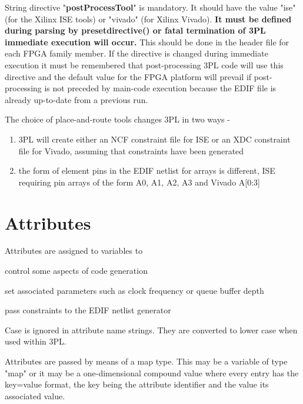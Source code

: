         String directive "{\bf postProcessTool}" is mandatory. It should have
	the value "ise" (for the Xilinx ISE tools) or "vivado" (for Xilinx
	Vivado).  {\bf It must be defined
        during parsing by presetdirective() or fatal termination of 3PL
        immediate execution will occur.} This should be done in the header file
        for each FPGA family member. If the directive is changed during
        immediate execution it must be remembered that post-processing 3PL code
        will use this directive and the default value for the FPGA platform
        will prevail if post-processing is not preceded by main-code execution
        because the EDIF file is already up-to-date from a previous run.
        
        The choice of place-and-route tools changes 3PL in two ways -
        \begin{enumerate}
        \item   3PL will create either an NCF constraint file for ISE or an
                XDC constraint file for Vivado, assuming that constraints
                have been generated
        \item   the form of element pins in the EDIF netlist for arrays is
                different, ISE requiring pin arrays of the form A0, A1, A2,
                A3 and Vivado A[0:3]
        \end{enumerate}
        
        
        

        
        

    \section{Attributes}\label{sec:attributes}

        Attributes are assigned to variables to 
        \blist
        \item   control some aspects of code generation
        \item   set associated parameters such as clock frequency or queue buffer depth
        \item   pass constraints to the EDIF netlist generator
        \blend
        
        Case is ignored in attribute name strings. They are converted to lower
        case when used within 3PL.
        
        Attributes are passed by means of a map type. This may be a variable
        of type "map" or it may be a one-dimensional compound value where every
        entry has the key=value format, the key being the attribute identifier
        and the value its associated value.
        
